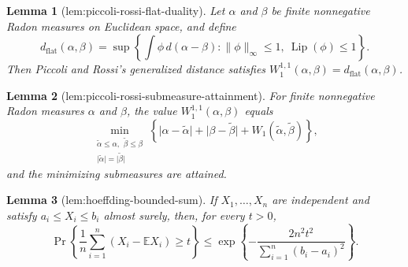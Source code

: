 \documentclass{article}
\newtheorem{lemma}{Lemma}
\begin{document}
\begin{lemma}[lem:piccoli-rossi-flat-duality]\label{lem:piccoli-rossi-flat-duality}
Let \(\alpha\) and \(\beta\) be finite nonnegative Radon measures on Euclidean
space, and define
\[
 d_{\mathrm{flat}}(\alpha,\beta)
 =\sup\left\{\int \phi\,d(\alpha-\beta):
       \lVert\phi\rVert_\infty\leq1,\ \operatorname{Lip}(\phi)\leq1\right\}.
\]
Then Piccoli and Rossi's generalized distance satisfies
\(W_1^{1,1}(\alpha,\beta)=d_{\mathrm{flat}}(\alpha,\beta)\).
\end{lemma}

\begin{lemma}[lem:piccoli-rossi-submeasure-attainment]\label{lem:piccoli-rossi-submeasure-attainment}
For finite nonnegative Radon measures \(\alpha\) and \(\beta\), the value
\(W_1^{1,1}(\alpha,\beta)\) equals
\[
 \min_{\substack{\widetilde\alpha\leq\alpha,\ \,
                  \widetilde\beta\leq\beta\\
                  \lvert\widetilde\alpha\rvert=\lvert\widetilde\beta\rvert}}
 \left\{\lvert\alpha-\widetilde\alpha\rvert
       +\lvert\beta-\widetilde\beta\rvert
       +W_1(\widetilde\alpha,\widetilde\beta)\right\},
\]
and the minimizing submeasures are attained.
\end{lemma}

\begin{lemma}[lem:hoeffding-bounded-sum]\label{lem:hoeffding-bounded-sum}
If \(X_1,\ldots,X_n\) are independent and satisfy
\(a_i\leq X_i\leq b_i\) almost surely, then, for every \(t>0\),
\[
 \Pr\left\{\frac1n\sum_{i=1}^n(X_i-\mathbb EX_i)\geq t\right\}
 \leq \exp\left\{-\frac{2n^2t^2}{\sum_{i=1}^n(b_i-a_i)^2}\right\}.
\]
\end{lemma}
\end{document}
